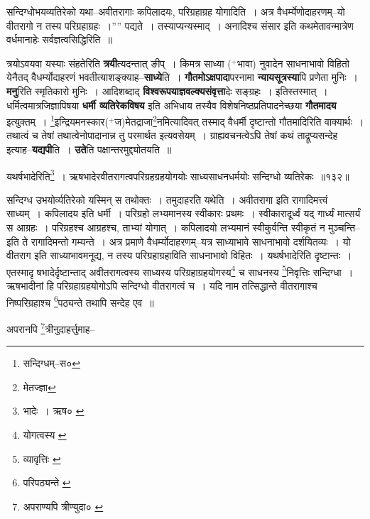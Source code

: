 \documentclass[article,12pt,a4paper]{memoir}
\newcommand{\add}[1]{($^{+}$#1)}
\begin{document}
	सन्दिग्धोभयव्यतिरेको यथा--अवीतरागाः कपिलादयः, परिग्रहाग्रह योगादिति । अत्र वैधर्म्येणोदाहरणम्--यो वीतरागो न तस्य परिग्रहाग्रहः ।”” पद्यते । तस्याप्यन्यस्माद् । अनादिश्च संसार इति कथमेतावन्मात्रेण वर्धमानाहेः सर्वज्ञत्वसिद्धिरिति ॥
	\pend
      

	  \pstart त्रयोऽवयवा यस्याः संहतेरिति \textbf{त्रयी}त्यदन्तात् ङीप् । किमत्र साध्या \add{भावा} नुवादेन साधनाभावो विहितो येनैतद् वैधर्म्योदाहरणं भवतीत्याशङ्क्याह--\textbf{साध्ये}ति । \textbf{गौतमोऽक्षपादा}परनामा \textbf{न्यायसूत्रस्या}पि प्रणेता मुनिः । \textbf{मनु}रिति स्मृतिकारो मुनिः । आदिशब्दाद् \textbf{विश्वरूपयाज्ञवल्क्यसंवृत्ता}देः सङ्ग्रहः । इतिस्तस्मात् । धर्मित्वमात्रजिज्ञापिषया \textbf{धर्मी व्यतिरेकविषय} इति अभिधाय तस्यैव विशेषनिष्ठप्रतिपादनेच्छया \textbf{गौतमादय} इत्युक्तम् । \footnote{सन्दिग्धम्--स०}इन्द्रियमनस्कार\add{ज}मेतद्राजा\footnote{मेतज्ज्ञा}नमित्यादिवत् तस्माद् वैधर्मी दृष्टान्तो गौतमादिरिति वाक्यार्थः । तथात्वं च तेषां तथात्वेनोपादानान्न तु परमार्थत इत्यवसेयम् । ग्राह्यवचनत्वेऽपि तेषां कथं ताद्रूप्यसन्देह इत्याह--\textbf{यद्यपी}ति । \textbf{उते}ति पक्षान्तरमुद्द्योतयति ॥
	\pend
      \leavevmode{}
	  \bigskip
	  \begingroup
	
	  \bigskip
	  \begingroup
	

	  \pstart यथर्षभादेरिति\footnote{भादेः । ऋष० \cite{dp-msC}} । ऋषभादेरवीतरागत्वपरिग्रहग्रहयोगयोः साध्यसाधनधर्मयोः सन्दिग्धो व्यतिरेकः ॥१३२॥
	\pend
      
	  \endgroup
	 

	  \pstart सन्दिग्ध उभयोर्व्यतिरेको यस्मिन् स तथोक्तः । तमुदाहरति यथेति । अवीतरागा इति रागादिमत्त्वं साध्यम् । कपिलादय इति धर्मी । परिग्रहो लभ्यमानस्य स्वीकारः प्रथमः । स्वीकारादूर्ध्वं यद् गार्ध्यं मात्सर्यं स आग्रहः । परिग्रहश्च आग्रहश्च, ताभ्यां योगात् । कपिलादयो लभ्यमानं स्वीकुर्वन्ति स्वीकृतं न मुञ्चन्ति--इति ते रागादिमन्तो गम्यन्ते । अत्र प्रमाणे वैधर्म्योदाहरणम्--यत्र साध्याभावे साधनाभावो दर्शयितव्यः । यो वीतराग इति साध्याभावमनूद्य, न तस्य परिग्रहाग्रहाविति साधनाभावो विहितः । यथर्षभादेरिति दृष्टान्तः । एतस्मादृ षभादेर्दृष्टान्ताद् अवीतरागत्वस्य साध्यस्य परिग्रहाग्रहयोगस्य\footnote{योगत्वस्य \cite{dp-msA}} च साधनस्य \footnote{व्यावृत्तिः \cite{dp-msC} \cite{dp-edE}}निवृत्तिः सन्दिग्धा । ऋषभादीनां हि परिग्रहाग्रहयोगोऽपि सन्दिग्धो वीतरागत्वं च । यदि नाम तत्सिद्धान्ते वीतरागाश्च निष्परिग्रहाश्च \footnote{परिपठ्यन्ते \cite{dp-msD}}पठ्यन्ते तथापि सन्देह एव ॥
	\pend
       

	  \pstart अपरानपि \footnote{अपराण्यपि त्रीण्युदा० \cite{dp-msD}}त्रीनुदाहर्त्तुमाह--
	\pend
       
\end{document}

